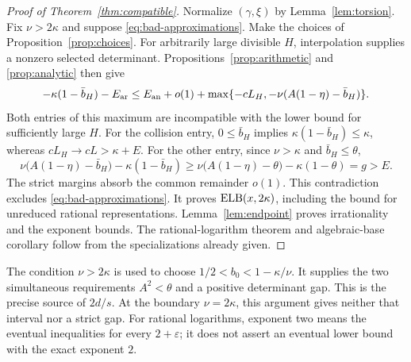 \begin{proof}[Proof of Theorem~\ref{thm:compatible}]
Normalize \((\gamma,\xi)\) by Lemma~\ref{lem:torsion}.
Fix \(\nu>2\kappa\) and suppose \eqref{eq:bad-approximations}.
Make the choices of Proposition~\ref{prop:choices}.
For arbitrarily large divisible \(H\), interpolation supplies a
nonzero selected determinant. Propositions~\ref{prop:arithmetic} and
\ref{prop:analytic} then give
\[
 -\kappa(1-\bar b_H)-E_{\rm ar}
 \le E_{\rm an}+o(1)
       +\max\{-cL_H,-\nu(A(1-\eta)-\bar b_H)\}.
\]
Both entries of this maximum are incompatible with the lower bound
for sufficiently large \(H\).
For the collision entry, \(0\le\bar b_H\) implies
\(\kappa(1-\bar b_H)\le\kappa\), whereas
\(cL_H\to cL>\kappa+E\).
For the other entry, since \(\nu>\kappa\) and
\(\bar b_H\le\theta\),
\[
 \nu\bigl(A(1-\eta)-\bar b_H\bigr)
     -\kappa(1-\bar b_H)
 \ge \nu\bigl(A(1-\eta)-\theta\bigr)-\kappa(1-\theta)
 =g>E.
\]
The strict margins absorb the common remainder \(o(1)\).
This contradiction excludes \eqref{eq:bad-approximations}.
It proves \(\operatorname{ELB}(x,2\kappa)\), including the bound for unreduced
rational representations. Lemma~\ref{lem:endpoint} proves
irrationality and the exponent bounds.
The rational-logarithm theorem and algebraic-base corollary follow
from the specializations already given.
\end{proof}

\begin{remark}
The condition \(\nu>2\kappa\) is used to choose
\(1/2<b_0<1-\kappa/\nu\).
It supplies the two simultaneous requirements \(A^2<\theta\) and a
positive determinant gap. This is the precise source of \(2d/s\).
At the boundary \(\nu=2\kappa\), this argument gives neither that
interval nor a strict gap.
For rational logarithms, exponent two means the eventual inequalities
for every \(2+\varepsilon\); it does not assert an eventual lower
bound with the exact exponent \(2\).
\end{remark}
